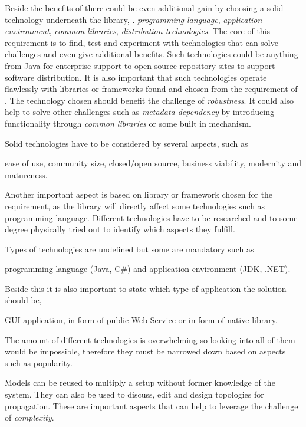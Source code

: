 Beside the benefits of  there could be even additional gain by choosing
a solid technology underneath the library, \eg. \emph{programming language},
\emph{application environment}, \emph{common libraries}, \emph{distribution technologies}.
The core of this requirement is to find, test and experiment with technologies that can solve
challenges and even give additional benefits.
Such technologies could be anything from Java for enterprise support to open source repository
sites to support software distribution.
It is also important that such technologies operate flawlessly with libraries or frameworks
found and chosen from the requirement of .
The technology chosen should benefit the challenge of \emph{robustness}.
It could also help to solve other challenges such as \emph{metadata dependency} by introducing
functionality through \emph{common libraries} or some built in mechanism.

Solid technologies have to be considered by several aspects, such as
\begin{ii}
  \iitem ease of use,
  \iitem community size,
  \iitem closed/open source,
  \iitem business viability,
  \iitem modernity and 
  \iitem matureness.
\end{ii}
Another important aspect is based on library or framework chosen for the  requirement,
as the library will directly affect some technologies such as programming language.
Different technologies have to be researched and to some degree physically tried out to identify
which aspects they fulfill.

Types of technologies are undefined but some are mandatory such as 
\begin{ii}
  \iitem programming language (Java, C\#) and 
  \iitem application environment (JDK, .NET).
\end{ii}
Beside this it is also important to state which type of application the solution should be, 
\begin{ii}
  \iitem GUI application,
  \iitem {} in form of public Web Service or
  \iitem {} in form of native library.
\end{ii}
The amount of different technologies is overwhelming so looking into all of them would be impossible,
therefore they must be narrowed down based on aspects such as popularity.

Models can be reused to multiply a setup without former knowledge of the system.
They can also be used to discuss, edit and design topologies for propagation. 
These are important aspects that can help to leverage the challenge of \emph{complexity}.

